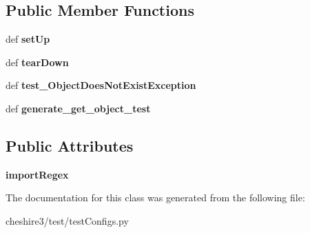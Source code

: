 \subsection*{Public Member Functions}
\begin{DoxyCompactItemize}
\item 
\hypertarget{classcheshire3_1_1test_1_1test_configs_1_1_cheshire3_server_configs_test_case_ac645866487844810cdba2ae2ae5c4116}{def {\bfseries set\-Up}}\label{classcheshire3_1_1test_1_1test_configs_1_1_cheshire3_server_configs_test_case_ac645866487844810cdba2ae2ae5c4116}

\item 
\hypertarget{classcheshire3_1_1test_1_1test_configs_1_1_cheshire3_server_configs_test_case_accb064ddfe3ac307bc0f27ff2c252e76}{def {\bfseries tear\-Down}}\label{classcheshire3_1_1test_1_1test_configs_1_1_cheshire3_server_configs_test_case_accb064ddfe3ac307bc0f27ff2c252e76}

\item 
\hypertarget{classcheshire3_1_1test_1_1test_configs_1_1_cheshire3_server_configs_test_case_a6976577fd870e2837570352c751a6922}{def {\bfseries test\-\_\-\-Object\-Does\-Not\-Exist\-Exception}}\label{classcheshire3_1_1test_1_1test_configs_1_1_cheshire3_server_configs_test_case_a6976577fd870e2837570352c751a6922}

\item 
\hypertarget{classcheshire3_1_1test_1_1test_configs_1_1_cheshire3_server_configs_test_case_a62ff9289fa3a9fb02cedb33ba45930c2}{def {\bfseries generate\-\_\-get\-\_\-object\-\_\-test}}\label{classcheshire3_1_1test_1_1test_configs_1_1_cheshire3_server_configs_test_case_a62ff9289fa3a9fb02cedb33ba45930c2}

\end{DoxyCompactItemize}
\subsection*{Public Attributes}
\begin{DoxyCompactItemize}
\item 
\hypertarget{classcheshire3_1_1test_1_1test_configs_1_1_cheshire3_server_configs_test_case_ada627ae3079c0d5d8676ca8125760cfd}{{\bfseries import\-Regex}}\label{classcheshire3_1_1test_1_1test_configs_1_1_cheshire3_server_configs_test_case_ada627ae3079c0d5d8676ca8125760cfd}

\end{DoxyCompactItemize}


The documentation for this class was generated from the following file\-:\begin{DoxyCompactItemize}
\item 
cheshire3/test/test\-Configs.\-py\end{DoxyCompactItemize}
